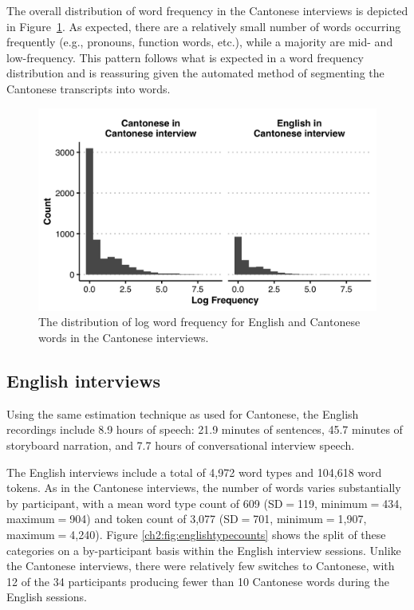The overall distribution of word frequency in the Cantonese interviews is depicted in Figure~\ref{ch2:fig:cantonesewordfrequency}. As expected, there are a relatively small number of words occurring frequently (e.g., pronouns, function words, etc.), while a majority are mid- and low-frequency. This pattern follows what is expected in a word frequency distribution and is reassuring given the automated method of segmenting the Cantonese transcripts into words. 

\begin{figure}[ht]
  \begin{center}
  \includegraphics[width=4.9in]{figures/ch2_cantonesewordfrequency_5in.png} 
  \caption{The distribution of log word frequency for English and Cantonese words in the Cantonese interviews.}
  \label{ch2:fig:cantonesewordfrequency}
  \end{center}
  \end{figure}

\subsection{English interviews}\label{ch2:subsec:english_descriptive}

Using the same estimation technique as used for Cantonese, the English recordings include 8.9 hours of speech: 21.9 minutes of sentences, 45.7 minutes of storyboard narration, and 7.7 hours of conversational interview speech.

The English interviews include a total of 4,972 word types and 104,618 word tokens. As in the Cantonese interviews, the number of words varies substantially by participant, with a mean word type count of 609 (SD$=$119, minimum$=$434, maximum$=$904) and token count of 3,077 (SD$=$701, minimum$=$1,907, maximum$=$4,240). Figure \ref{ch2:fig:englishtypecounts} shows the split of these categories on a by-participant basis within the English interview sessions. Unlike the Cantonese interviews, there were relatively few switches to Cantonese, with 12 of the 34 participants producing fewer than 10 Cantonese words during the English sessions.

